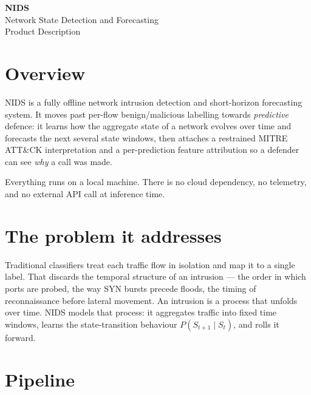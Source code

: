 \documentclass[11pt,a4paper]{article}
\begin{document}
\begin{center}
  {\LARGE\bfseries NIDS}\\[2pt]
  {\large Network State Detection and Forecasting}\\[6pt]
  {\small Product Description}
\end{center}

\section{Overview}

NIDS is a fully offline network intrusion detection and short-horizon
forecasting system. It moves past per-flow benign/malicious labelling towards
\emph{predictive} defence: it learns how the aggregate state of a network
evolves over time and forecasts the next several state windows, then attaches a
restrained MITRE ATT\&CK interpretation and a per-prediction feature
attribution so a defender can see \emph{why} a call was made.

Everything runs on a local machine. There is no cloud dependency, no telemetry,
and no external API call at inference time.

\section{The problem it addresses}

Traditional classifiers treat each traffic flow in isolation and map it to a
single label. That discards the temporal structure of an intrusion --- the
order in which ports are probed, the way SYN bursts precede floods, the timing
of reconnaissance before lateral movement. An intrusion is a process that
unfolds over time. NIDS models that process: it aggregates traffic into
fixed time windows, learns the state-transition behaviour
$P(S_{t+1}\mid S_t)$, and rolls it forward.

\section{Pipeline}
\end{document}

